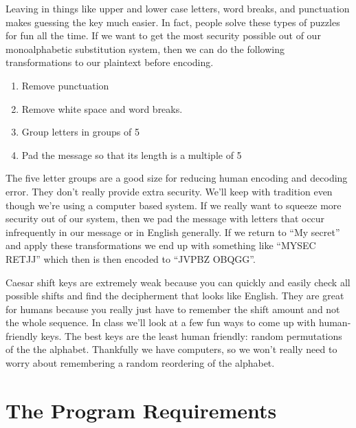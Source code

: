 \documentclass[]{tufte-handout}
\begin{document}
Leaving in things like upper and lower case letters, word breaks, and punctuation makes guessing the key much easier. In fact, people solve these types of puzzles for fun all the time. If we want to get the most security possible out of our monoalphabetic substitution system, then we can do the following transformations to our plaintext before encoding.
\begin{enumerate}
\item Remove punctuation
\item Remove white space and word breaks.
\item Group letters in groups of 5
\item Pad the message so that its length is a multiple of 5
\end{enumerate}
The five letter groups are a good size for reducing human encoding and decoding error.  They don't really provide extra security. We'll keep with tradition even though we're using a computer based system. If we really want to squeeze more security out of our system, then we pad the message with letters that occur infrequently in our message or in English generally. If we return to ``My secret'' and apply these transformations we end up with something like ``MYSEC RETJJ'' which then is then encoded to ``JVPBZ OBQGG''.    

Caesar shift keys are extremely weak because you can quickly and easily check all possible shifts and find the decipherment that looks like English. They are great for humans because you really just have to remember the shift amount and not the whole sequence. In class we'll look at a few fun ways to come up with human-friendly keys.  The best keys are the least human friendly: random permutations of the the alphabet. Thankfully we have computers, so we won't really need to worry about remembering a random reordering of the alphabet.

\section{The Program Requirements}
\end{document}
